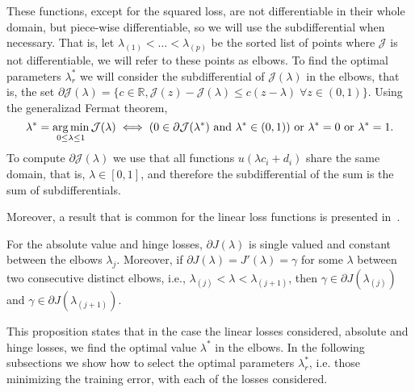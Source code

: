 %
These functions, except for the squared loss, are not differentiable in their whole domain, but piece-wise differentiable, so we will use the subdifferential when necessary.  That is, let ${\lambda}_{(1)} < \ldots < {\lambda}_{(p)}$ be the sorted list of points where $\mathcal{J}$ is not differentiable, we will refer to these points as elbows.
To find the optimal parameters $\lambda_r^*$ we will consider the subdifferential of $\mathcal{J}(\lambda)$ in the elbows, that is, the set $\partial \mathcal{J}(\lambda) = \{c \in \mathbb{R}, \mathcal{J}(z)-\mathcal{J}(\lambda) \leq c (z - \lambda)\;  \forall z \in (0, 1) \}$.
%
Using the generalizad Fermat theorem,
\begin{equation}
    \nonumber
    \lambda^* = \operatorname*{arg\min}_{0 \leq \lambda \leq 1} \mathcal{J}(\lambda) \iff (0 \in \partial \mathcal{J}(\lambda^*) \text{ and } \lambda^* \in (0, 1) ) \text{ or } \lambda^*=0 \text{ or } \lambda^*=1 .
\end{equation}
To compute $\partial \mathcal{J}(\lambda)$ we use that all functions $u(\lambda c_i + d_i)$ share the same domain, that is, $\lambda \in [0, 1]$, and therefore the subdifferential of the sum is the sum of subdifferentials.
%

Moreover, a result that is common for the linear loss functions is presented in~\citet[Proposition 1]{RuizAD21}.
\begin{prop}\label{prop:elbows_neurocom2020}
    For the absolute value and hinge losses, $\partial J(\lambda)$ is single valued and constant between the elbows $\lambda_j$.
    Moreover, if $\partial J(\lambda) = J'(\lambda) = \gamma$ for some $\lambda$ between two consecutive distinct elbows, i.e., $\lambda_{(j)} < \lambda < \lambda_{(j+1)}$, then $\gamma \in \partial J(\lambda_{(j)})$ and $\gamma \in \partial J(\lambda_{(j+1)})$. 
\end{prop}
This proposition states that in the case the linear losses considered, absolute and hinge losses, we find the optimal value $\lambda^*$ in the elbows.
In the following subsections we show how to select the optimal parameters $\lambda_r^*$, i.e. those minimizing the training error, with each of the losses considered.

